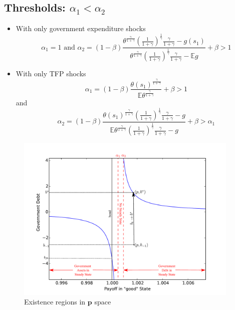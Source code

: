 \documentclass[12pt]{article}
\newcommand{\EE}{\mathbb E}
\begin{document}
\subsection{Thresholds: $\alpha_1 <\alpha_2$}
	\begin{itemize}
		\item With only government expenditure shocks
		\[
			\alpha_1 = 1 \text{  and }  \alpha_2 = (1-\beta)\frac{\theta^\frac{\gamma}{1+\gamma}\left(\frac{1}{1+\gamma}\right)^\frac1\gamma\frac{\gamma}{1+\gamma}-g(s_1)}{\theta^\frac{\gamma}{1+\gamma}\left(\frac{1}{1+\gamma}\right)^\frac1\gamma\frac{\gamma}{1+\gamma}-\EE g} +\beta>1
		\]
		\item With only TFP shocks
		\[
			\alpha_1 = (1-\beta)\frac{\theta(s_1)^\frac{\gamma}{1+\gamma}}{\EE\theta^\frac{\gamma}{1+\gamma}}+\beta > 1
		\]and
		\[
		\alpha_2 = (1-\beta)\frac{\theta(s_1)^\frac{\gamma}{1+\gamma}\left(\frac{1}{1+\gamma}\right)^\frac1\gamma\frac{\gamma}{1+\gamma}-g}{\EE\theta^\frac{\gamma}{1+\gamma}\left(\frac{1}{1+\gamma}\right)^\frac1\gamma\frac{\gamma}{1+\gamma}-g}+\beta>\alpha_1
		\]
	\end{itemize}

	\begin{figure}
		\begin{center}
		\includegraphics[width=4.2in]{Images/graph_nostable.pdf}
\caption{Existence regions in $\bm{p}$ space}
	\end{center}	
	\end{figure}
\end{document}
